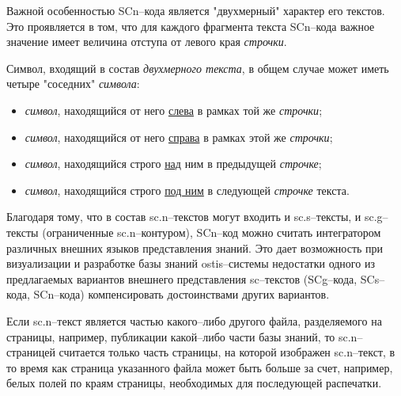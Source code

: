 \begin{SCn}
\end{SCn}

Важной особенностью SCn--кода является "двухмерный"{} характер его текстов. Это проявляется в том, что для каждого фрагмента текста SCn--кода важное значение имеет величина отступа от левого края \textit{строчки}.


Символ, входящий в состав \textit{двухмерного текста}, в общем случае может иметь четыре "соседних"{} \textit{символа}: 
\begin{itemize}
	\item \textit{символ}, находящийся от него \uline{слева} в рамках той же \textit{строчки};
	\item \textit{символ}, находящийся от него \uline{справа} в рамках этой же \textit{строчки};
	\item \textit{символ}, находящийся строго \uline{над} ним в предыдущей \textit{строчке};
	\item \textit{символ}, находящийся строго \uline{под ним} в следующей \textit{строчке} текста.
\end{itemize}


Благодаря тому, что в состав sc.n--текстов могут входить и sc.s--тексты, и sc.g--тексты (ограниченные sc.n--контуром), SCn--код можно считать интегратором различных внешних языков представления знаний.  Это дает возможность при визуализации и разработке базы знаний ostis--системы недостатки одного из предлагаемых вариантов внешнего представления sc--текстов (SCg--кода, SCs--кода, SCn--кода) компенсировать достоинствами других вариантов.

\begin{SCn}
\end{SCn}

Если sc.n--текст является частью какого--либо другого файла, разделяемого на страницы, например, публикации какой--либо части базы знаний, то sc.n--страницей считается только часть страницы, на которой изображен sc.n--текст, в то время как страница указанного файла может быть больше за счет, например, белых полей по краям страницы, необходимых для последующей распечатки.



